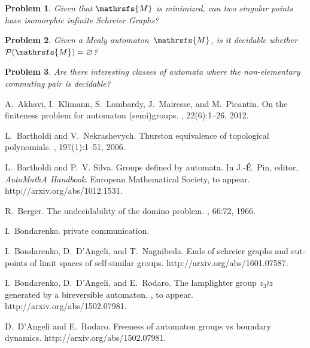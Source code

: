 \documentclass{amsart}
\newtheorem{prob}{Problem}
\begin{document}
{\begin{prob}\label{prob:isolated}
Given that ${{{\mathrsfs{{M}}}}}$ is minimized, can two singular points have isomorphic infinite Schreier Graphs?
\end{prob}

\begin{prob}
Given a Mealy automaton~${{{\mathrsfs{{M}}}}}$, is it decidable whether $\mathcal{P}({{{\mathrsfs{{M}}}}})=\varnothing$?
\end{prob}

\begin{prob}
Are there interesting classes of automata where the non-elementary commuting pair is decidable?
\end{prob}



\begin{thebibliography}{10}

A.~Akhavi, I.~Klimann, S.~Lombardy, J.~Mairesse, and M.~Picantin.
\newblock On the finiteness problem for automaton (semi)groups.
, 22(6):1--26,
  2012.

L.~Bartholdi and V.~Nekrashevych.
\newblock Thurston equivalence of topological polynomials.
, 197(1):1--51, 2006.

L.~Bartholdi and P.~V. Silva.
\newblock Groups defined by automata.
\newblock In J.-{\'{E}}. Pin, editor, {\em AutoMathA Handbook}. European
  Mathematical Society, to appear.
\newblock http://arxiv.org/abs/1012.1531.

R.~Berger.
\newblock The undecidability of the domino problem.
, 66:72, 1966.

I.~Bondarenko.
\newblock private communication.

I.~Bondarenko, D.~D'Angeli, and T.~Nagnibeda.
\newblock Ends of schreier graphs and cut-points of limit spaces of
  self-similar groups.
\newblock http://arxiv.org/abs/1601.07587.

I.~Bondarenko, D.~D'Angeli, and E.~Rodaro.
\newblock The lamplighter group $z_3\wr z$ generated by a bireversible
  automaton.
, to appear.
\newblock http://arxiv.org/abs/1502.07981.

D.~D'Angeli and E.~Rodaro.
\newblock Freeness of automaton groups vs boundary dynamics.
\newblock http://arxiv.org/abs/1502.07981.


\end{thebibliography}}
\end{document}
